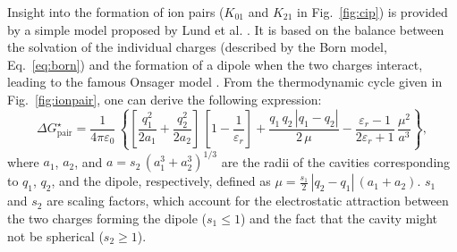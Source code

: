 \documentclass[review]{elsarticle}
\begin{document}
Insight into the formation of ion pairs ($K_{01}$ and $K_{21}$ in Fig.~\ref{fig:cip}) is provided by a simple model proposed by Lund et al. \cite{lundDielectricInterpretationSpecificity2010}. It is based on the balance between the solvation of the individual charges (described by the Born model, Eq.~\eqref{eq:born}) and the formation of a dipole when the two charges interact, leading to the famous Onsager model \cite{onsagerElectricMomentsMolecules1936,aubretUnderstandingLocalField2019}. From the thermodynamic cycle given in Fig.~\ref{fig:ionpair}, one can derive the following expression: \begin{equation}
	\Delta G_{\text{pair}}^\star = \frac{1}{4\pi\varepsilon_0}\,\left\{\left[\frac{q_1^2}{2a_1}+\frac{q_2^2}{2a_2}\right]\,\left[1-\frac{1}{\varepsilon_r}\right]+\frac{q_1\,q_2\,|q_1-q_2|}{2\,\mu}-\frac{\varepsilon_r-1}{2\varepsilon_r+1}\,\frac{\mu^2}{a^3}\right\},\label{eq:pair}
\end{equation}
where $a_1$, $a_2$, and $a=s_2\,( a_1^3+a_2^3)^{1/3}$ are the radii of the cavities corresponding to $q_1$, $q_2$, and the dipole, respectively, defined as $\mu = \frac{s_1}{2}\,|q_2-q_1|\,(a_1+a_2)$.  $s_1$ and $s_2$ are scaling factors, which account for the electrostatic attraction between the two charges forming the dipole ($s_1\leq 1$) and the fact that the cavity might not be spherical ($s_2\geq 1$).
\end{document}
